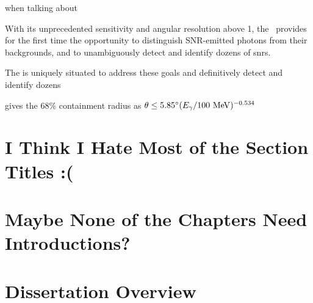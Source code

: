 when talking about \egret{}

With its unprecedented sensitivity and angular resolution above 1\gev, the \lat~provides for the first time the opportunity to distinguish SNR-emitted photons from their backgrounds, and  to unambiguously detect and identify dozens of \glspl{snr}. 

The \lat{} is uniquely situated to address these goals and definitively detect and identify dozens \snrs

\cite{Thomson93} gives the 68\% containment radius as $\theta \leq 5.85^\circ (E_\gamma /100 ~\mathrm{MeV} )^{-0.534}$
\section{I Think I Hate Most of the Section Titles :(}

\section{Maybe None of the Chapters Need Introductions?}

\section{Dissertation Overview}



